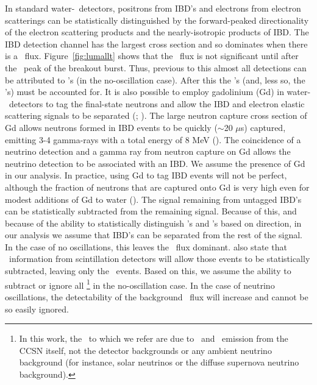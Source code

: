 In standard water-\cer\ detectors, positrons from
IBD's and electrons from 
electron scatterings can be statistically distinguished by the
forward-peaked directionality of the electron scattering products and the
nearly-isotropic products of IBD.
 The IBD
detection channel has the largest cross section and so 
dominates when there is a \anue\ flux.  Figure~\ref{fig:lumallt} shows
that the \anue\ flux is not significant until after the
\nue\ peak of the breakout burst.
Thus, previous to this almost all detections can be attributed
to \nue's (in the no-oscillation case).
After this the \anue's (and, less so, the \nux's) 
must be accounted
for.  It is also possible to 
employ gadolinium (Gd) in water-\cer\ detectors 
to tag the final-state neutrons and allow the IBD and
electron elastic scattering signals to be separated
(\citealt{vagins2012}; \citealt{lahabeacom2014}).  The large neutron
capture cross section of Gd allows neutrons formed in IBD events to be
quickly ($\sim$20 $\mu$s) captured, emitting 3-4 gamma-rays with a total
energy of 8 MeV (\citealt{beacomvagins2004}).  
The coincidence of a neutrino
detection and a gamma ray from neutron capture on Gd 
allows the neutrino detection to be associated with an IBD.  We
assume the presence of Gd in our analysis.  In practice, using Gd to
tag IBD events will not be perfect, although the fraction of neutrons
that are captured onto Gd is very high even for modest additions of Gd
to water (\citealt{beacomvagins2004}).  The signal remaining from
untagged IBD's can be statistically subtracted from the remaining signal.
Because of this, and because of the ability to statistically distinguish
\nue's and \anue's based on direction, in our analysis we assume that
IBD's can be separated from the rest of the signal.  In the case of no
oscillations, this leaves the \nue\ flux dominant.
\cite{lahabeacom2014} also state that \nux\ 
information from scintillation detectors 
will allow those events to be statistically subtracted,
leaving only the \nue\ events.  Based on this, we assume the
ability to subtract or ignore all \backgrounds\footnote{In this work,
the \backgrounds\ to which we refer are due to \anue\ and \nux\
emission from the CCSN itself, not the detector backgrounds or any
ambient neutrino background (for instance, solar neutrinos or the
diffuse supernova neutrino background).} in the no-oscillation
case.  In the case of neutrino oscillations, the detectability of the 
background \nux\ flux
will increase and cannot be so easily ignored.

